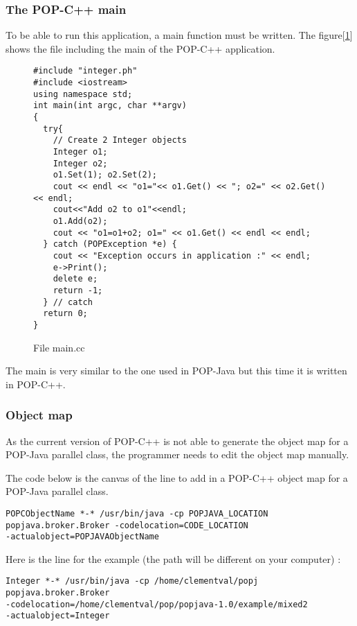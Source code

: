 \pagebreak
\subsubsection{The POP-C++ main}
To be able to run this application, a main function must be written. The figure[\ref{fig:main.cc}] shows the file including the main of the POP-C++ application.

\begin{figure}[ht]
	\caption{File main.cc}
	\label{fig:main.cc}
\begin{lstlisting}
#include "integer.ph"
#include <iostream>
using namespace std;
int main(int argc, char **argv)
{
  try{
    // Create 2 Integer objects
    Integer o1;
    Integer o2;
    o1.Set(1); o2.Set(2);
    cout << endl << "o1="<< o1.Get() << "; o2=" << o2.Get() << endl;
    cout<<"Add o2 to o1"<<endl;
    o1.Add(o2);
    cout << "o1=o1+o2; o1=" << o1.Get() << endl << endl;
  } catch (POPException *e) {
    cout << "Exception occurs in application :" << endl;
    e->Print();
    delete e;
    return -1;
  } // catch
  return 0;
}
\end{lstlisting}
\end{figure}

The main is very similar to the one used in POP-Java but this time it is written in POP-C++. 

\subsubsection{Object map}
As the current version of POP-C++ is not able to generate the object map for a POP-Java parallel class, the programmer needs to edit the object map manually.\s

The code below is the canvas of the line to add in a POP-C++ object map for a POP-Java parallel class.\s

\begin{lstlisting}
POPCObjectName *-* /usr/bin/java -cp POPJAVA_LOCATION 
popjava.broker.Broker -codelocation=CODE_LOCATION 
-actualobject=POPJAVAObjectName
\end{lstlisting}\s

Here is the line for the example (the path will be different on your computer) : 
\begin{lstlisting}
Integer *-* /usr/bin/java -cp /home/clementval/popj 
popjava.broker.Broker
-codelocation=/home/clementval/pop/popjava-1.0/example/mixed2
-actualobject=Integer
\end{lstlisting}


